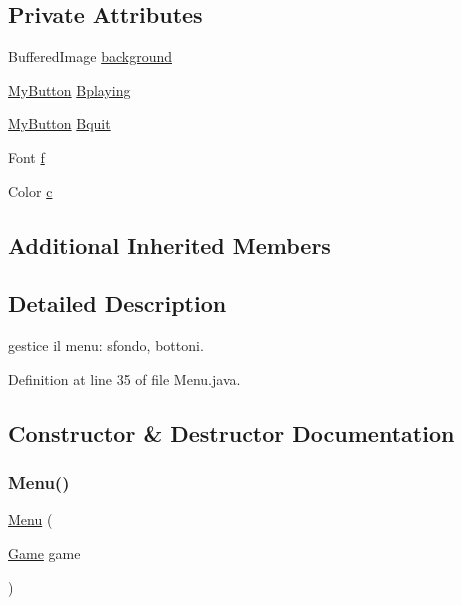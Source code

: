 \subsection*{Private Attributes}
\begin{DoxyCompactItemize}
\item 
Buffered\+Image \hyperlink{classscenes_1_1_menu_a714354485419fb2b615f17fcce85657e}{background}
\item 
\hyperlink{classui_1_1_my_button}{My\+Button} \hyperlink{classscenes_1_1_menu_a6ae4732612c0dde2b4c09415d929195c}{Bplaying}
\item 
\hyperlink{classui_1_1_my_button}{My\+Button} \hyperlink{classscenes_1_1_menu_aade8ed8111cde7693a187ea2ad3406b9}{Bquit}
\item 
Font \hyperlink{classscenes_1_1_menu_a3fb562f10e8f7f83cb2ed130eab6d439}{f}
\item 
Color \hyperlink{classscenes_1_1_menu_a02094092ae89aa4b23bff1976bcbf90d}{c}
\end{DoxyCompactItemize}
\subsection*{Additional Inherited Members}


\subsection{Detailed Description}
gestice il menu\+: sfondo, bottoni. 

Definition at line 35 of file Menu.\+java.



\subsection{Constructor \& Destructor Documentation}
\mbox{\label{classscenes_1_1_menu_aa568425829ee847c6c97c418516a3c81}} 
\subsubsection{\texorpdfstring{Menu()}{Menu()}}
{\footnotesize\ttfamily \hyperlink{classscenes_1_1_menu}{Menu} (\begin{DoxyParamCaption}\item[{\hyperlink{classprogetto_1_1_game}{Game}}]{game }\end{DoxyParamCaption})}



